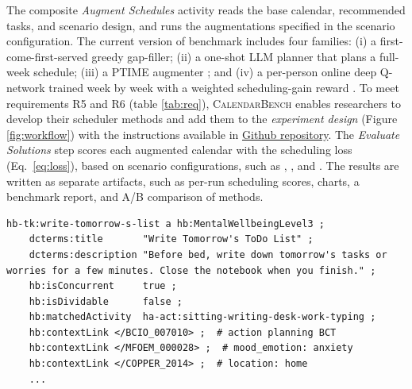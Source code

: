 \documentclass[runningheads]{llncs}
\begin{document}
The composite \textit{Augment Schedules} activity reads the base calendar, recommended tasks, and scenario design, and runs the augmentations specified in the scenario configuration. The current version of benchmark includes four families: (i) a first-come-first-served greedy gap-filler; (ii) a one-shot LLM planner that plans a full-week schedule; (iii) a PTIME augmenter \citep{Berry2011PTIME:Calendaring}; and (iv) a per-person online deep Q-network trained week by week with a weighted scheduling-gain reward \citep{Mnih2015,Yuan2022}. To meet  requirements R5 and R6 (table  \ref{tab:req}), \textsc{CalendarBench} enables researchers to develop their scheduler methods and add them to the \textit{experiment design} (Figure \ref{fig:workflow}) with the instructions available in \href{https://github.com/MaaniBeigy/calendar-bench}{Github repository}. The \textit{Evaluate Solutions} step scores each augmented calendar with the scheduling loss (Eq.~\ref{eq:loss}), based on scenario configurations, such as , , and . The results are written as separate artifacts, such as per-run scheduling scores, charts, a benchmark report, and A/B comparison of methods.
 


\begin{lstlisting}[caption={An example task with its grounded context.},label={lst:healthtask-ttl}]
hb-tk:write-tomorrow-s-list a hb:MentalWellbeingLevel3 ;
    dcterms:title       "Write Tomorrow's ToDo List" ;
    dcterms:description "Before bed, write down tomorrow's tasks or worries for a few minutes. Close the notebook when you finish." ;
    hb:isConcurrent     true ;
    hb:isDividable      false ;
    hb:matchedActivity  ha-act:sitting-writing-desk-work-typing ;
    hb:contextLink </BCIO_007010> ;  # action planning BCT
    hb:contextLink </MFOEM_000028> ;  # mood_emotion: anxiety
    hb:contextLink </COPPER_2014> ;  # location: home
    ...
\end{lstlisting}
\end{document}
